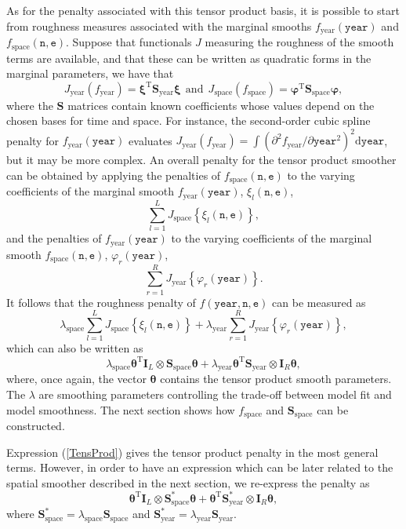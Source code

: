 As for the penalty associated with this tensor product basis, it is possible to start from roughness measures associated with the marginal smooths $f_\text{year}(\texttt{year})$ and $f_\text{space}(\texttt{n},\texttt{e})$. Suppose that functionals $J$ measuring the roughness of the smooth terms are available, and that these can be written as quadratic forms in the marginal parameters, we have that
$$
J_\text{year}(f_\text{year})=\bm\xi^\text{T}\textbf{S}_\text{year}\bm\xi \ \ \text{and} \ \ J_\text{space}(f_\text{space})=\bm\varphi^\text{T}\textbf{S}_\text{space}\bm\varphi,
$$
where the $\textbf{S}$ matrices contain known coefficients whose values depend on the chosen bases for time and space. For instance, the second-order cubic spline penalty for $f_\text{year}(\texttt{year})$ evaluates $J_\text{year}(f_\text{year})=\int\left( \partial^2 f_\text{year}/\partial \texttt{year}^2 \right)^2 \text{d}\texttt{year}$, but it may be more complex. An overall penalty for the tensor product smoother can be obtained by applying the penalties of $f_\text{space}(\texttt{n},\texttt{e})$ to the varying coefficients of the marginal smooth $f_\text{year}(\texttt{year})$, $\xi_l(\texttt{n},\texttt{e})$,
$$
\sum_{l=1}^L J_\text{space}\left\{  \xi_l(\texttt{n},\texttt{e}) \right\},
$$ 
and the penalties of $f_\text{year}(\texttt{year})$ to the varying coefficients of the marginal smooth $f_\text{space}(\texttt{n},\texttt{e})$, $\varphi_r(\texttt{year})$,  
$$
\sum_{r=1}^R J_\text{year}\left\{  \varphi_r(\texttt{year}) \right\}.
$$ 
It follows that the roughness penalty of $f(\texttt{year},\texttt{n},\texttt{e})$ can be measured as 
$$
\lambda_\text{space} \sum_{l=1}^L J_\text{space}\left\{  \xi_l(\texttt{n},\texttt{e}) \right\} + \lambda_\text{year} \sum_{r=1}^R J_\text{year}\left\{  \varphi_r(\texttt{year}) \right\},
$$
which can also be written as
\begin{equation}
\lambda_\text{space} \bm\theta^\text{T} \textbf{I}_L \otimes \textbf{S}_\text{space} \bm\theta + \lambda_\text{year} \bm\theta^\text{T} \textbf{S}_\text{year} \otimes \textbf{I}_R  \bm\theta,
\label{TensProd}
\end{equation}
where, once again, the vector $\bm\theta$ contains the tensor product smooth parameters. The $\lambda$ are smoothing parameters controlling the trade-off between model fit and model smoothness. The next section shows how $f_\text{space}$ and $\textbf{S}_\text{space}$ can be constructed.   

Expression (\ref{TensProd}) gives the tensor product penalty in the most general terms. However, in order to have an expression which can be later related to the spatial smoother described in the next section, we re-express the penalty as
$$
\bm\theta^\text{T} \textbf{I}_L \otimes \textbf{S}^*_\text{space} \bm\theta + \bm\theta^\text{T} \textbf{S}^*_\text{year} \otimes \textbf{I}_R  \bm\theta,
$$
where $\textbf{S}^*_\text{space}=\lambda_\text{space} \textbf{S}_\text{space}$ and $\textbf{S}^*_\text{year}=\lambda_\text{year} \textbf{S}_\text{year}$.


